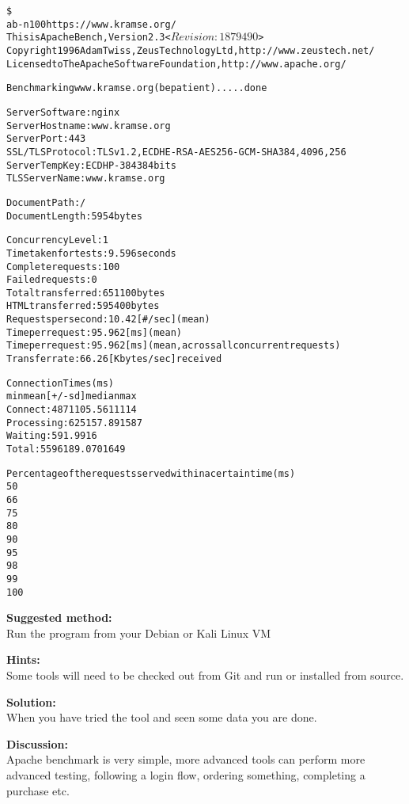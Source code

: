 \documentclass[a4paper,11pt,notitlepage]{report}
\begin{document}
\begin{alltt}\footnotesize
\$
ab -n 100 https://www.kramse.org/
This is ApacheBench, Version 2.3 <$Revision: 1879490 $>
Copyright 1996 Adam Twiss, Zeus Technology Ltd, http://www.zeustech.net/
Licensed to The Apache Software Foundation, http://www.apache.org/

Benchmarking www.kramse.org (be patient).....done


Server Software:        nginx
Server Hostname:        www.kramse.org
Server Port:            443
SSL/TLS Protocol:       TLSv1.2,ECDHE-RSA-AES256-GCM-SHA384,4096,256
Server Temp Key:        ECDH P-384 384 bits
TLS Server Name:        www.kramse.org

Document Path:          /
Document Length:        5954 bytes

Concurrency Level:      1
Time taken for tests:   9.596 seconds
Complete requests:      100
Failed requests:        0
Total transferred:      651100 bytes
HTML transferred:       595400 bytes
Requests per second:    10.42 [#/sec] (mean)
Time per request:       95.962 [ms] (mean)
Time per request:       95.962 [ms] (mean, across all concurrent requests)
Transfer rate:          66.26 [Kbytes/sec] received

Connection Times (ms)
              min  mean[+/-sd] median   max
Connect:       48   71 105.5     61    1114
Processing:     6   25 157.8      9    1587
Waiting:        5    9   1.9      9      16
Total:         55   96 189.0     70    1649

Percentage of the requests served within a certain time (ms)
  50%     70
  66%     72
  75%     73
  80%     74
  90%     76
  95%     78
  98%   1124
  99%   1649
 100%   1649 (longest request)
\end{alltt}


{\bf Suggested method:}\\
Run the program from your Debian or Kali Linux VM


{\bf Hints:}\\
Some tools will need to be checked out from Git and run or installed from source.

{\bf Solution:}\\
When you have tried the tool and seen some data you are done.

{\bf Discussion:}\\
Apache benchmark is very simple, more advanced tools can perform more advanced testing, following a login flow, ordering something, completing a purchase etc.
\end{document}
